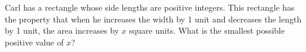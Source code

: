 Carl has a rectangle whose side lengths are positive integers. This rectangle has the property that when he increases the width by 1 unit and decreases the length by 1 unit, the area increases by $x$ square units. What is the smallest possible positive value of $x$?
